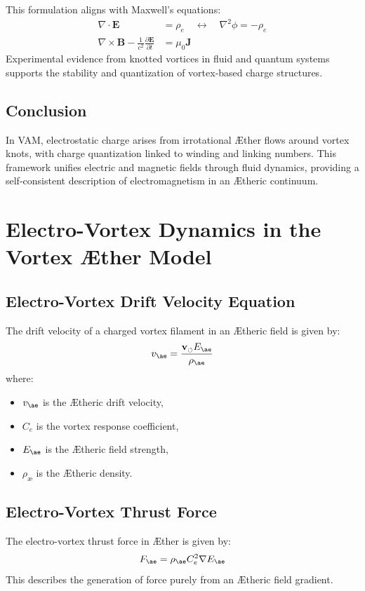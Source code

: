 \documentclass[a4paper,12pt]{article}
\begin{document}
This formulation aligns with Maxwell's equations:
\begin{align}
    \nabla \cdot \mathbf{E} &= \rho_e \quad \leftrightarrow \quad \nabla^2 \phi = -\rho_e \\
    \nabla \times \mathbf{B} - \frac{1}{c^2}\frac{\partial \mathbf{E}}{\partial t} &= \mu_0 \mathbf{J}
\end{align}
Experimental evidence from knotted vortices in fluid and quantum systems supports the stability and quantization of vortex-based charge structures.


\subsection{Conclusion}


In VAM, electrostatic charge arises from irrotational Æther flows around vortex knots, with charge quantization linked to winding and linking numbers. This framework unifies electric and magnetic fields through fluid dynamics, providing a self-consistent description of electromagnetism in an Ætheric continuum.

\section{Electro-Vortex Dynamics in the Vortex Æther Model}

\subsection{Electro-Vortex Drift Velocity Equation}
The drift velocity of a charged vortex filament in an Ætheric field is given by:
\begin{equation}
    v_{\ae} = \frac{\mathbf{v}_{\scriptscriptstyle\boldsymbol{\circlearrowleft}} E_{\ae}}{\rho_\text{\ae}}
\end{equation}
where:
\begin{itemize}
    \item $v_{\ae}$ is the Ætheric drift velocity,
    \item $C_e$ is the vortex response coefficient,
    \item $E_{\ae}$ is the Ætheric field strength,
    \item $\rho_\text{\ae}$ is the Ætheric density.
\end{itemize}

\subsection{Electro-Vortex Thrust Force}
The electro-vortex thrust force in Æther is given by:
\begin{equation}
    F_{\ae} = \rho_\text{\ae} C_e^2 \nabla E_{\ae}
\end{equation}
This describes the generation of force purely from an Ætheric field gradient.
\end{document}
